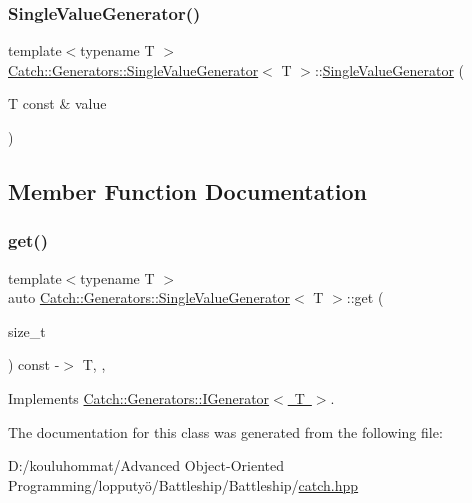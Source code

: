 \subsubsection{\texorpdfstring{Single\+Value\+Generator()}{SingleValueGenerator()}}
{\footnotesize\ttfamily template$<$typename T $>$ \\
\mbox{\hyperlink{class_catch_1_1_generators_1_1_single_value_generator}{Catch\+::\+Generators\+::\+Single\+Value\+Generator}}$<$ T $>$\+::\mbox{\hyperlink{class_catch_1_1_generators_1_1_single_value_generator}{Single\+Value\+Generator}} (\begin{DoxyParamCaption}\item[{T const \&}]{value }\end{DoxyParamCaption})\hspace{0.3cm}{\ttfamily [inline]}}



\subsection{Member Function Documentation}
\mbox{\label{class_catch_1_1_generators_1_1_single_value_generator_ad03af3fe263136425595bfd2eec84209}} 
\subsubsection{\texorpdfstring{get()}{get()}}
{\footnotesize\ttfamily template$<$typename T $>$ \\
auto \mbox{\hyperlink{class_catch_1_1_generators_1_1_single_value_generator}{Catch\+::\+Generators\+::\+Single\+Value\+Generator}}$<$ T $>$\+::get (\begin{DoxyParamCaption}\item[{size\+\_\+t}]{ }\end{DoxyParamCaption}) const -\/$>$ T\hspace{0.3cm}{\ttfamily [inline]}, {\ttfamily [override]}, {\ttfamily [virtual]}}



Implements \mbox{\hyperlink{struct_catch_1_1_generators_1_1_i_generator_a737a89eb0bff02e580e36c59fb0d1171}{Catch\+::\+Generators\+::\+I\+Generator$<$ T $>$}}.



The documentation for this class was generated from the following file\+:\begin{DoxyCompactItemize}
\item 
D\+:/kouluhommat/\+Advanced Object-\/\+Oriented Programming/lopputyö/\+Battleship/\+Battleship/\mbox{\hyperlink{catch_8hpp}{catch.\+hpp}}\end{DoxyCompactItemize}
